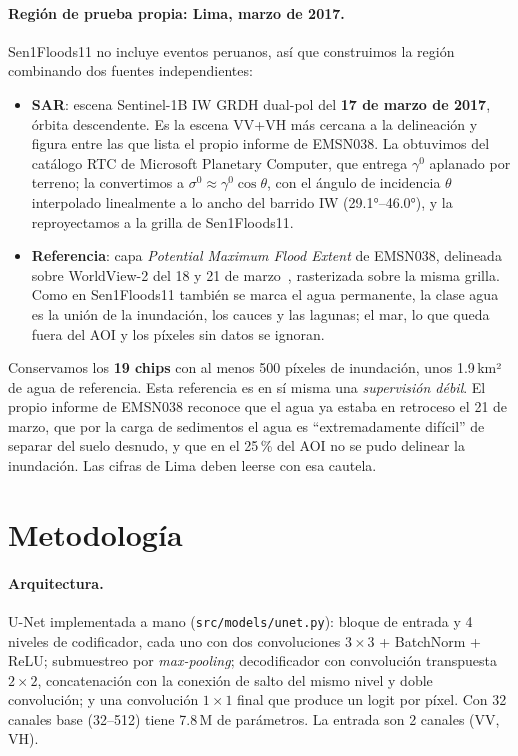 \documentclass{article}
\begin{document}
\paragraph{Región de prueba propia: Lima, marzo de 2017.} Sen1Floods11 no incluye eventos peruanos,
así que construimos la región combinando dos fuentes independientes:
\begin{itemize}
  \item \textbf{SAR}: escena Sentinel-1B IW GRDH dual-pol del \textbf{17 de marzo de 2017}, órbita
  descendente. Es la escena VV+VH más cercana a la delineación y figura entre las que lista el propio
  informe de EMSN038. La obtuvimos del catálogo RTC de Microsoft Planetary Computer, que entrega
  $\gamma^0$ aplanado por terreno; la convertimos a $\sigma^0 \approx \gamma^0\cos\theta$, con el
  ángulo de incidencia $\theta$ interpolado linealmente a lo ancho del barrido IW (29.1°--46.0°), y la
  reproyectamos a la grilla de Sen1Floods11.
  \item \textbf{Referencia}: capa \emph{Potential Maximum Flood Extent} de EMSN038, delineada sobre
  WorldView-2 del 18 y 21 de marzo~\cite{cems2017emsn038}, rasterizada sobre la misma grilla. Como en
  Sen1Floods11 también se marca el agua permanente, la clase agua es la unión de la inundación, los cauces
  y las lagunas; el mar, lo que queda fuera del AOI y los píxeles sin datos se ignoran.
\end{itemize}
Conservamos los \textbf{19 chips} con al menos 500 píxeles de inundación, unos 1.9\,km² de agua de
referencia. Esta referencia es en sí misma una \emph{supervisión débil}. El propio informe de EMSN038
reconoce que el agua ya estaba en retroceso el 21 de marzo, que por la carga de sedimentos el agua es
``extremadamente difícil'' de separar del suelo desnudo, y que en el 25\,\% del AOI no se pudo delinear
la inundación. Las cifras de Lima deben leerse con esa cautela.

\section{Metodología}

\paragraph{Arquitectura.} U-Net implementada a mano (\texttt{src/models/unet.py}): bloque de entrada y
4 niveles de codificador, cada uno con dos convoluciones $3\times3$ + BatchNorm + ReLU; submuestreo por
\emph{max-pooling}; decodificador con convolución transpuesta $2\times2$, concatenación con la conexión
de salto del mismo nivel y doble convolución; y una convolución $1\times1$ final que produce un logit
por píxel. Con 32 canales base (32--512) tiene 7.8\,M de parámetros. La entrada son 2 canales (VV, VH).
\end{document}

